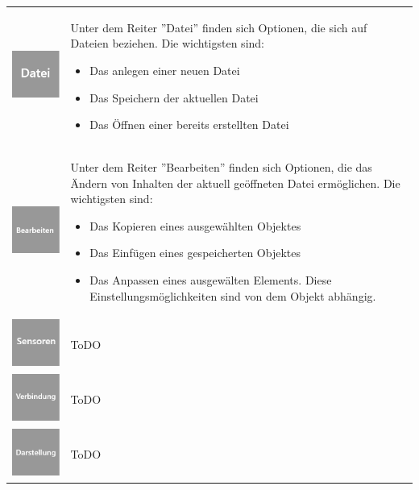 \documentclass[parskip=full]{scrartcl}
\begin{document}
\begin{tabular}[t]{p{1cm} p{10cm}}
	\vspace{0cm}\includegraphics[width = 1 cm]{Grafik/Datei.jpg} & Unter dem Reiter ''Datei'' finden sich Optionen, die sich auf Dateien beziehen. Die wichtigsten sind: 
	\begin{itemize} 
		\item Das anlegen einer neuen Datei
		\item Das Speichern der aktuellen Datei
		\item Das Öffnen einer bereits erstellten Datei
	\end{itemize}\\
	\vspace{0cm}\includegraphics[width = 1 cm]{Grafik/Bearbeiten.jpg} & Unter dem Reiter ''Bearbeiten'' finden sich Optionen, die das Ändern von Inhalten der aktuell geöffneten Datei ermöglichen. Die wichtigsten sind:
	\begin{itemize} 
		\item Das Kopieren eines ausgewählten Objektes
		\item Das Einfügen eines gespeicherten Objektes
		\item Das Anpassen eines ausgewälten Elements. Diese Einstellungsmöglichkeiten sind von dem Objekt abhängig.
	\end{itemize}\\
	\vspace{0cm}\includegraphics[width = 1 cm]{Grafik/Sensor.jpg} & ToDO\\
	\vspace{0cm}\includegraphics[width = 1 cm]{Grafik/Verbindung.jpg} & ToDO\\
	\vspace{0cm}\includegraphics[width = 1 cm]{Grafik/Dartstellung.jpg} & ToDO\\

\end{tabular}
\end{document}

